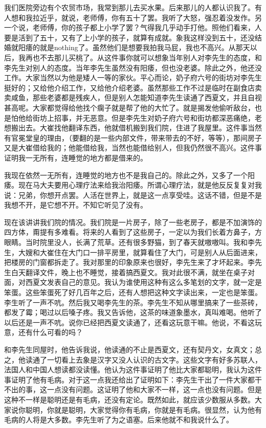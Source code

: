 我们医院旁边有个农贸市场，我常到那儿去买水果。后来那儿的人都认识我了。有人想和我拉近乎，就说，老师傅，你有五十了罢。我听了大怒，强忍着没发作。另一个说，老师傅，你的孩子都上小学了罢？气得我几乎动手打他。照他们看来，人要是活到了五十，又有了上小学的孩子，就算有成就。象我这样没到五十，还没结婚就阳痿的就是nothing了。虽然他们是想要我拍我马屁，我也不高兴。从那天以后，我再也不去那儿买桃了。从这件事你就可以想象当年别人对李先生的态度，和李先生对别人的态度。当年李先生虽然没有阳痿，但也没老婆。除此之外，他还没工作。大家当然以为他是矮人一等的家伙。平心而论，奶子府六号的街坊对李先生挺好的；又给他介绍工作，又给他介绍老婆。虽然那些工作不过是临时在副食店卖卖咸鱼，那些老婆都是残疾人，但是别人怎能知道李先生读通了西夏文，并且自视甚高呢。大家都觉得给他找个瘸子就是帮了他的大忙了。就是揭发他偷听敌台，也是怕他给街坊上招事，并无恶意。但是李先生对奶子府六号和街坊都深恶痛绝，老想搬出去。大崔找他翻译东西，他就借机搬到我们院，住进了我屋里。这件事当然有官冕堂皇的理由，（要翻的是一些内部文件，带来带去的不好，等等），那间房子又是大崔借给我的；他能借给我，当然也能借给别人，但我仍然很不高兴。这件事证明我一无所有，连睡觉的地方都是借来的。 

我现在依然一无所有，连睡觉的地方也不是我自己的。除此之外，又多了一个阳痿。现在马大夫要用心理疗法来给我治阳痿。所谓心理疗法，就是他反反复复对我说：兄弟，你想开点罢。人活在世界上，就是这一点享受哇。这话不错，但是不是我想不开，是它想不开。不知它听见了没有。 

现在该讲讲我们院的情况。我们院是一片房子，除了一些老房子，都是不加演饰的四方体，甭提有多难看。将来的人看到了这些房子，一定以为我们长着方鼻子，方眼睛。当时院里没人，长满了荒草。还有很多野猫，到了春天就嗷嗷叫。我和李先生，大嫂和大崔住在大门口一排平房里，就算看住了大门，可是别人从后面进来，把楼房的门窗都拆走了。我对那里的印象原来也很好，李先生来了才坏起来。李先生白天翻译文件，晚上也不睡觉，接着搞西夏文。我对此很不满，就坐在桌子对面，对西夏文发表自己的意见。我认为谁使用这种有这么多笔划的文字，就一定是笨蛋。这些笨蛋死了好几百年之后，还有人想把这种文字读出来，一定也是笨蛋。李生听了一声不吭。然后我又喝李先生的茶。李先生不知从哪里搞来了一些茶砖，都发了霉；喝过以后嗓子疼。我又告诉他，这茶的味道象墨水，真叫难喝。他听了以后还是一声不吭。说你已经把西夏文读通了，还看这玩意干嘛。他说，不看这玩意，还有什么可看的吗？ 

和李先生同屋时，他告诉我说，他读通的不止是西夏文，还有契丹文，女真文；总之，他读通了一切看上去象是汉字又没人认识的古文字。这些文字有好多苏联人，法国人和中国人想读都没读懂。他认为这件事证明了他比大家都聪明，我认为这件事证明了他有毛病。对于这一点我还给出了证明如下：李先生干出了一件大家都干不出的事，这一点没有问题。这证明了他和大家不一样，这一点也没有问题。但是这种不一样是聪明还是有毛病，还没有定论。既然如此，就应该少数服从多数。大家说你聪明，你就是聪明，大家觉得你有毛病，你就是有毛病。很显然，认为他有毛病的人将是大多数。李先生听了为之语塞。后来他就不和我说什么了。 

